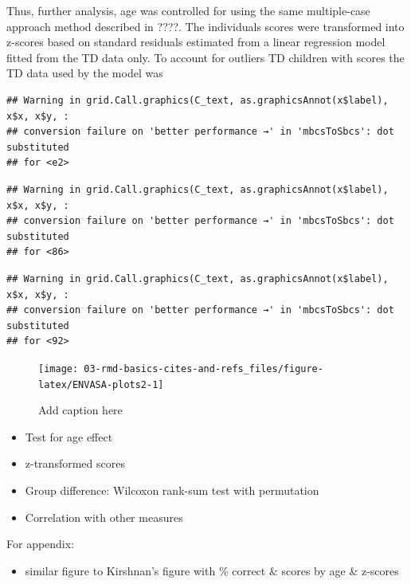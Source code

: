 \documentclass[a4paper,nobind]{templates/ociamthesis}
\providecommand{\tightlist}{%
  \setlength{\itemsep}{0pt}\setlength{\parskip}{0pt}}
\begin{document}
Thus, further analysis, age was controlled for using the same
multiple-case approach method described in ????. The individuals scores
were transformed into z-scores based on standard residuals estimated
from a linear regression model fitted from the TD data only. To account
for outliers TD children with scores the TD data used by the model was

\begin{verbatim}
## Warning in grid.Call.graphics(C_text, as.graphicsAnnot(x$label), x$x, x$y, :
## conversion failure on 'better performance →' in 'mbcsToSbcs': dot substituted
## for <e2>
\end{verbatim}

\begin{verbatim}
## Warning in grid.Call.graphics(C_text, as.graphicsAnnot(x$label), x$x, x$y, :
## conversion failure on 'better performance →' in 'mbcsToSbcs': dot substituted
## for <86>
\end{verbatim}

\begin{verbatim}
## Warning in grid.Call.graphics(C_text, as.graphicsAnnot(x$label), x$x, x$y, :
## conversion failure on 'better performance →' in 'mbcsToSbcs': dot substituted
## for <92>
\end{verbatim}

\begin{figure}

{\centering \texttt{[image: 03-rmd-basics-cites-and-refs\_files/figure-latex/ENVASA-plots2-1]} 

}

\caption{Add caption here}\label{fig:ENVASA-plots2}
\end{figure}

\begin{itemize}
\item
  Test for age effect
\item
  z-transformed scores
\item
  Group difference: Wilcoxon rank-sum test with permutation
\item
  Correlation with other measures
\end{itemize}

For appendix:

\begin{itemize}
\tightlist
\item
  similar figure to Kirshnan's figure with \% correct \& scores by age
  \& z-scores
\end{itemize}
\end{document}

